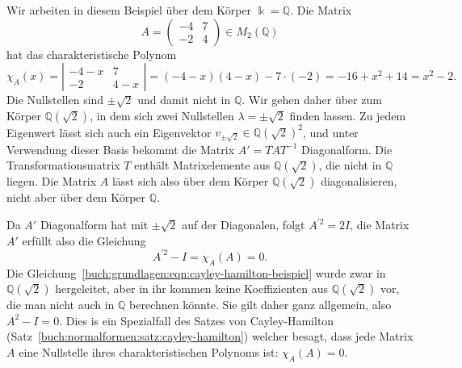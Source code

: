 \begin{beispiel}
Wir arbeiten in diesem Beispiel über dem Körper $\Bbbk=\mathbb{Q}$.
Die Matrix
\[
A=\begin{pmatrix}
-4&7\\
-2&4
\end{pmatrix}
\in
M_2(\mathbb{Q})
\]
hat das charakteristische Polynom
\[
\chi_A(x)
=
\left|
\begin{matrix}
-4-x&7\\-2&4-x
\end{matrix}
\right|
=
(-4-x)(4-x)-7\cdot(-2)
=
-16+x^2+14
=
x^2-2.
\]
Die Nullstellen sind $\pm\sqrt{2}$ und damit nicht in $\mathbb{Q}$.
Wir gehen daher über zum Körper $\mathbb{Q}(\!\sqrt{2})$, in dem
sich zwei Nullstellen $\lambda=\pm\sqrt{2}$ finden lassen.
Zu jedem Eigenwert lässt sich auch ein Eigenvektor
$v_{\pm\sqrt{2}}\in \mathbb{Q}(\!\sqrt{2})^2$, und unter Verwendung dieser
Basis bekommt die Matrix $A'=TAT^{-1}$ Diagonalform.
Die Transformationsmatrix $T$ enthält Matrixelemente aus
$\mathbb{Q}(\!\sqrt{2})$, die nicht in $\mathbb{Q}$ liegen.
Die Matrix $A$ lässt sich also über dem Körper $\mathbb{Q}(\!\sqrt{2})$
diagonalisieren, nicht aber über dem Körper $\mathbb{Q}$.

Da $A'$ Diagonalform hat mit $\pm\sqrt{2}$ auf der Diagonalen, folgt
$A^{\prime 2} = 2I$, die Matrix $A'$ erfüllt also die Gleichung
\begin{equation}
A^{\prime 2}-I= \chi_{A}(A) = 0.
\label{buch:grundlagen:eqn:cayley-hamilton-beispiel}
\end{equation}
Die Gleichung~\ref{buch:grundlagen:eqn:cayley-hamilton-beispiel}
wurde zwar in $\mathbb{Q}(\!\sqrt{2})$ hergeleitet, aber in ihr kommen
keine Koeffizienten aus $\mathbb{Q}(\!\sqrt{2})$ vor, die man nicht auch
in $\mathbb{Q}$ berechnen könnte.
Sie gilt daher ganz allgemein, also $A^2-I=0$.
Dies is ein Spezialfall des Satzes von Cayley-Hamilton
%
%
(Satz~\ref{buch:normalformen:satz:cayley-hamilton})
welcher besagt, dass jede Matrix $A$ eine Nullstelle ihres 
charakteristischen Polynoms ist: $\chi_A(A)=0$.
\end{beispiel}

